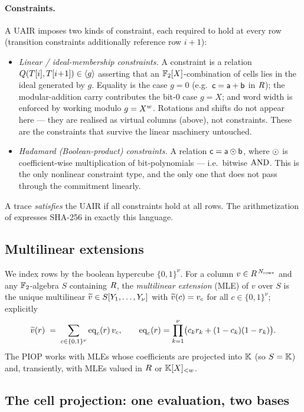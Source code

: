 \paragraph{Constraints.} A UAIR imposes two kinds of constraint, each
required to hold at every row (transition constraints additionally
reference row $i\!+\!1$):
\begin{itemize}[leftmargin=2em]
  \item \emph{Linear / ideal-membership constraints.} A constraint is a
    relation $Q(T[i],T[i\!+\!1]) \in \langle g \rangle$ asserting that an
    $\mathbb{F}_2[X]$-combination of cells lies in the ideal generated by $g$.
    Equality is the case $g = 0$ (e.g.\ $\mathsf{c} = \mathsf{a}+\mathsf{b}$ in
    $R$); the modular-addition carry contributes the bit-$0$ case
    $g = X$; and word width is enforced by working modulo $g = X^{w}$.
    Rotations and shifts do not appear here --- they are realised as
    virtual columns (above), not constraints. These are the constraints
    that survive the linear machinery untouched.
  \item \emph{Hadamard (Boolean-product) constraints.} A relation
    $\mathsf{c} = \mathsf{a}\odot\mathsf{b}$, where $\odot$ is coefficient-wise
    multiplication of bit-polynomials --- i.e.\ bitwise $\operatorname{AND}$. This is
    the only nonlinear constraint type, and the only one that does not
    pass through the commitment linearly.
\end{itemize}
A trace \emph{satisfies} the UAIR if all constraints hold at all rows.
The arithmetization of  expresses SHA-256 in exactly this
language.

\subsection{Multilinear extensions}

We index rows by the boolean hypercube $\{0,1\}^{\nu}$. For a column
$v\in R^{\,N_{\mathrm{rows}}}$ and any $\mathbb{F}_2$-algebra $S$
containing $R$, the \emph{multilinear extension} (MLE) of $v$
over $S$ is the unique multilinear $\widetilde{v}\in S[Y_1,\dots,Y_\nu]$ with
$\widetilde{v}(c) = v_c$ for all $c\in\{0,1\}^\nu$; explicitly
\[
  \widetilde{v}(r) \;=\; \sum_{c\in\{0,1\}^{\nu}} \operatorname{eq}_c(r)\,v_c,
  \qquad
  \operatorname{eq}_c(r) = \prod_{k=1}^{\nu}\bigl(c_k r_k + (1-c_k)(1-r_k)\bigr).
\]
The PIOP works with MLEs whose coefficients are projected into $\mathbb{K}$ (so
$S = \mathbb{K}$) and, transiently, with MLEs valued in $R$ or $\mathbb{K}[X]_{<w}$.

\subsection{The cell projection: one evaluation, two bases}
\label{sec:projections}

